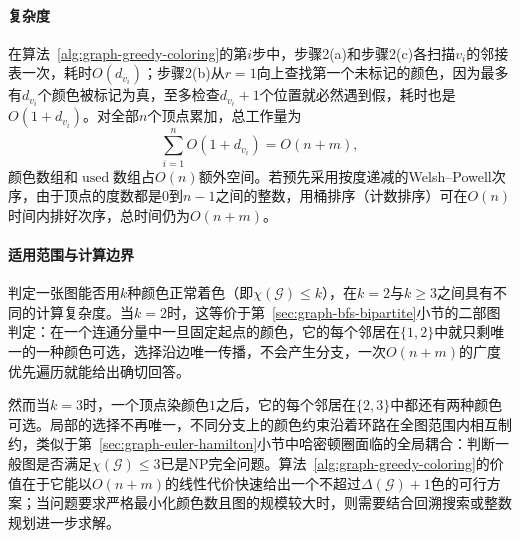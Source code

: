 \paragraph{复杂度}
在算法~\ref{alg:graph-greedy-coloring}的第$i$步中，步骤2(a)和步骤2(c)各扫描$v_i$的邻接表一次，耗时$O(d_{v_i})$；步骤2(b)从$r=1$向上查找第一个未标记的颜色，因为最多有$d_{v_i}$个颜色被标记为真，至多检查$d_{v_i}+1$个位置就必然遇到假，耗时也是$O(1+d_{v_i})$。对全部$n$个顶点累加，总工作量为
\[
\sum_{i=1}^{n}O(1+d_{v_i})=O(n+m),
\]
颜色数组和$\operatorname{used}$数组占$O(n)$额外空间。若预先采用按度递减的Welsh--Powell次序，由于顶点的度数都是$0$到$n-1$之间的整数，用桶排序（计数排序）可在$O(n)$时间内排好次序，总时间仍为$O(n+m)$。

\paragraph{适用范围与计算边界}
判定一张图能否用$k$种颜色正常着色（即$\chi(\mathcal G)\leq k$），在$k=2$与$k\geq 3$之间具有不同的计算复杂度。当$k=2$时，这等价于第~\ref{sec:graph-bfs-bipartite}小节的二部图判定：在一个连通分量中一旦固定起点的颜色，它的每个邻居在$\{1,2\}$中就只剩唯一的一种颜色可选，选择沿边唯一传播，不会产生分支，一次$O(n+m)$的广度优先遍历就能给出确切回答。

然而当$k=3$时，一个顶点染颜色$1$之后，它的每个邻居在$\{2,3\}$中都还有两种颜色可选。局部的选择不再唯一，不同分支上的颜色约束沿着环路在全图范围内相互制约，类似于第~\ref{sec:graph-euler-hamilton}小节中哈密顿圈面临的全局耦合：判断一般图是否满足$\chi(\mathcal G)\leq 3$已是NP完全问题。算法~\ref{alg:graph-greedy-coloring}的价值在于它能以$O(n+m)$的线性代价快速给出一个不超过$\Delta(\mathcal G)+1$色的可行方案；当问题要求严格最小化颜色数且图的规模较大时，则需要结合回溯搜索或整数规划进一步求解。
